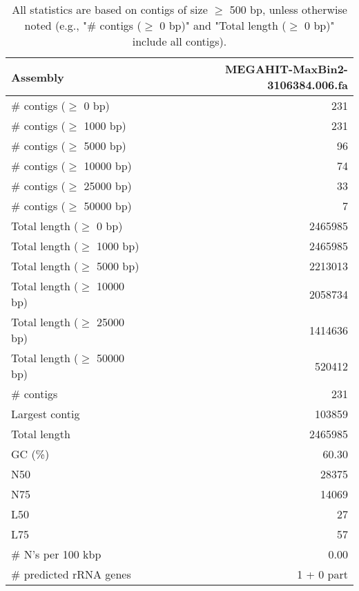 \documentclass[12pt,a4paper]{article}
\begin{document}
\begin{table}[ht]
\begin{center}
\caption{All statistics are based on contigs of size $\geq$ 500 bp, unless otherwise noted (e.g., "\# contigs ($\geq$ 0 bp)" and "Total length ($\geq$ 0 bp)" include all contigs).}
\begin{tabular}{|l*{1}{|r}|}
\hline
Assembly & MEGAHIT-MaxBin2-3106384.006.fa \\ \hline
\# contigs ($\geq$ 0 bp) & 231 \\ \hline
\# contigs ($\geq$ 1000 bp) & 231 \\ \hline
\# contigs ($\geq$ 5000 bp) & 96 \\ \hline
\# contigs ($\geq$ 10000 bp) & 74 \\ \hline
\# contigs ($\geq$ 25000 bp) & 33 \\ \hline
\# contigs ($\geq$ 50000 bp) & 7 \\ \hline
Total length ($\geq$ 0 bp) & 2465985 \\ \hline
Total length ($\geq$ 1000 bp) & 2465985 \\ \hline
Total length ($\geq$ 5000 bp) & 2213013 \\ \hline
Total length ($\geq$ 10000 bp) & 2058734 \\ \hline
Total length ($\geq$ 25000 bp) & 1414636 \\ \hline
Total length ($\geq$ 50000 bp) & 520412 \\ \hline
\# contigs & 231 \\ \hline
Largest contig & 103859 \\ \hline
Total length & 2465985 \\ \hline
GC (\%) & 60.30 \\ \hline
N50 & 28375 \\ \hline
N75 & 14069 \\ \hline
L50 & 27 \\ \hline
L75 & 57 \\ \hline
\# N's per 100 kbp & 0.00 \\ \hline
\# predicted rRNA genes & 1 + 0 part \\ \hline
\end{tabular}
\end{center}
\end{table}
\end{document}
